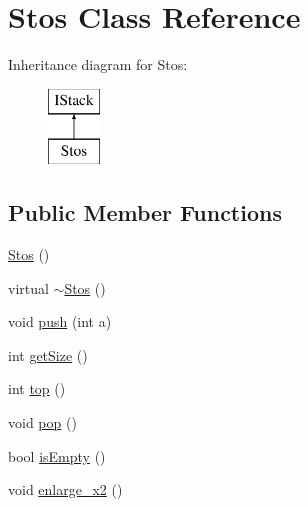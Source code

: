 \hypertarget{class_stos}{\section{Stos Class Reference}
\label{class_stos}
}
Inheritance diagram for Stos\-:\begin{figure}[H]
\begin{center}
\leavevmode
\includegraphics[height=2.000000cm]{class_stos}
\end{center}
\end{figure}
\subsection*{Public Member Functions}
\begin{DoxyCompactItemize}
\item 
\hyperlink{class_stos_a1de3b50386d5dfb56ddece17d0ea2389}{Stos} ()
\item 
virtual \hyperlink{class_stos_af9a198e2540e18adcc0b5259105fd78e}{$\sim$\-Stos} ()
\item 
void \hyperlink{class_stos_a8e592e006bfeb1fc678a9863a3156cf3}{push} (int a)
\item 
int \hyperlink{class_stos_a0aa50af4e55b9ceba61b44e33ef8dce2}{get\-Size} ()
\item 
int \hyperlink{class_stos_a83d252074388f18d49a950b6d312cc71}{top} ()
\item 
void \hyperlink{class_stos_a88b0da41b49ef4d4b63cfd4924665683}{pop} ()
\item 
bool \hyperlink{class_stos_a328eb30ceb157893dead1a9fe17597b7}{is\-Empty} ()
\item 
void \hyperlink{class_stos_a0afce6a79befd5b9b5663d75e0b92e7f}{enlarge\-\_\-x2} ()
\end{DoxyCompactItemize}


